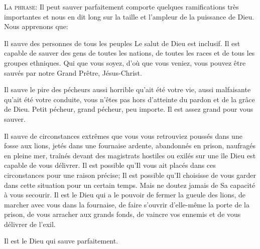 \lettrine{L}{a phrase:} 
 \Og Il peut sauver parfaitement \Fg{} comporte quelques ramifications
 très importantes et nous en dit long sur la taille et l'ampleur
 de la puissance de Dieu. Nous apprenons que: 

Il sauve des personnes de tous les peuples
 \ocadr Le salut de Dieu est inclusif.
 Il est capable de sauver des gens de toutes les nations,
 de toutes les races et de tous les groupes ethniques.
 Qui que vous soyez, d'où que vous veniez,
 vous pouvez être sauvés par notre Grand Prêtre, Jésus-Christ. 


Il sauve le pire des pécheurs \ocadr aussi horrible qu'ait été votre vie,
 aussi malfaisante qu'ait été votre conduite, vous n'êtes pas
 hors d'atteinte du pardon et de la grâce de Dieu.
 Petit pécheur, grand pécheur, peu importe.
 Il est assez grand pour vous sauver. 

Il sauve de circonstances extrêmes \ocadr que vous vous retrouviez poussés
 dans une fosse aux lions, jetés dans une fournaise ardente,
 abandonnés en prison, naufragés en pleine mer,
 traînés devant des magistrats hostiles ou exilés sur une île
 \ocadr Dieu est capable de vous délivrer.
 Il est possible qu'Il vous ait placés dans ces circonstances
 pour une raison précise; Il est possible qu'Il choisisse de vous garder
 dans cette situation pour un certain temps.
 Mais ne doutez jamais de Sa capacité à vous secourir.
 Il est le Dieu qui a le pouvoir de fermer la gueule des lions,
 de marcher avec vous dans la fournaise, de faire s'ouvrir d'elle-même
 la porte de la prison, de vous arracher aux grands fonds,
 de vaincre vos ennemis et de vous délivrer de l'exil. 

Il est le Dieu qui sauve parfaitement. 

\dvrule






